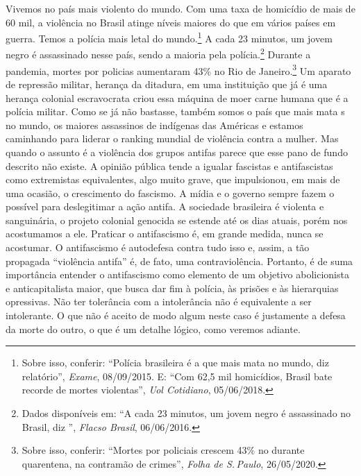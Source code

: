 Vivemos no país mais violento do mundo. Com uma taxa de homicídio de
mais de 60 mil, a violência no Brasil atinge níveis maiores do que em vários
países em guerra. Temos a polícia mais letal do mundo.\footnote{Sobre
  isso, conferir:
  ``Polícia brasileira é a que mais mata no mundo, diz relatório'', \emph{Exame}, 08/09/2015. E: ``Com 62,5 mil homicídios, Brasil bate recorde de mortes violentas'', \emph{Uol Cotidiano}, 05/06/2018.} A cada 23 minutos, um jovem negro é
assassinado nesse país, sendo a maioria pela polícia.\footnote{Dados
  disponíveis em:
  ``A cada 23 minutos, um jovem negro é assassinado no Brasil, diz '', \emph{Flacso Brasil}, 06/06/2016.} Durante a pandemia, mortes por policias
aumentaram 43\% no Rio de Janeiro.\footnote{Sobre isso, conferir:
  ``Mortes por policiais crescem 43\% no  durante quarentena, na contramão de crimes'', \emph{Folha de S.\,Paulo}, 26/05/2020.} Um aparato de repressão militar, herança da
ditadura, em uma instituição que já é uma herança colonial escravocrata
criou essa máquina de moer carne humana que é a polícia militar. Como se
já não bastasse, também somos o país que mais mata s no mundo, os
maiores assassinos de indígenas das Américas e estamos caminhando para
liderar o ranking mundial de violência contra a mulher. Mas quando o
assunto é a violência dos grupos antifas parece que esse pano de
fundo descrito não existe. A opinião pública tende a igualar fascistas e
antifascistas como extremistas equivalentes, algo muito grave, que impulsionou, em mais de uma ocasião, o crescimento do fascismo. A mídia e o governo
sempre fazem o possível para deslegitimar a ação antifa. A
sociedade brasileira é violenta e sanguinária, o projeto colonial
genocida se estende até os dias atuais, porém nos acostumamos a ele.
Praticar o antifascismo é, em grande medida, nunca se acostumar. O
antifascismo é autodefesa contra tudo isso e, assim, a tão propagada
``violência antifa'' é, de fato, uma contraviolência. Portanto, é de suma
importância entender o antifascismo como elemento de um objetivo
abolicionista e anticapitalista maior, que busca dar fim à polícia, às
prisões e às hierarquias opressivas. Não ter tolerância com a
intolerância não é equivalente a ser intolerante. O que não é aceito de
modo algum neste caso é justamente a defesa da morte do outro, o que é
um detalhe lógico, como veremos adiante.

